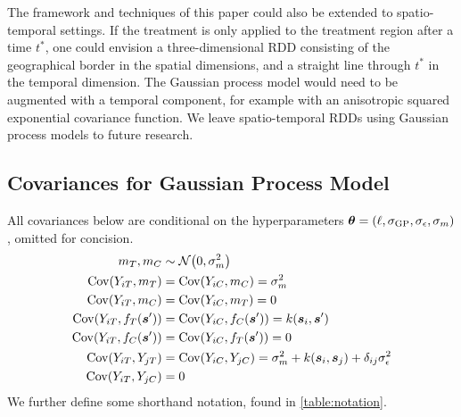 The framework and techniques of this paper could also be extended to spatio-temporal settings.
If the treatment is only applied to the treatment region after a time \(t^*\), one could envision a three-dimensional RDD consisting of the geographical border in the spatial dimensions, and a straight line through \(t^*\) in the temporal dimension.
The Gaussian process model would need to be augmented with a temporal component, for example with an anisotropic squared exponential covariance function.
We leave spatio-temporal RDDs using Gaussian process models to future research.





\begin{appendices}

\section{Covariances for Gaussian Process Model}
\label{sec:covariances}
All covariances below are conditional on the hyperparameters \(\bm{\theta} = \left\lparen\ell,\sigma_{\mathrm{GP}}, \sigma_{\epsilon}, \sigma_{m}\right\rparen\), omitted for concision.
\begin{equation}
    \begin{split}
        m_\treat, m_\ctrol   &\sim \normal\del{0,\sigmamu^2} \\
        \cov(Y_{i\treat},m_\treat)  &= \cov(Y_{i\ctrol},m_\ctrol) = \sigmamu^2 \\
        \cov(Y_{i\treat},m_\ctrol)  &= \cov(Y_{i\ctrol},m_\treat)  = 0 \\
        \cov\del{Y_{i\treat}, f_{\treat}(\svec')} &= \cov\del{Y_{i\ctrol}, f_{\ctrol}(\svec')} = k(\svec_i,\svec') \\
        \cov\del{Y_{i\treat}, f_{\ctrol}(\svec')} &= \cov\del{Y_{i\ctrol}, f_{\treat}(\svec')} = 0 \\
        \cov(Y_{i\treat},Y_{j\treat}) &= \cov(Y_{i\ctrol},Y_{j\ctrol}) = \sigmamu^2 + k(\svec_i,\svec_j) + \delta_{ij}\sigman^2 \\
        \cov(Y_{i\treat},Y_{j\ctrol}) &= 0
    \end{split}
    \label{eq:covariances}
\end{equation}
We further define some shorthand notation, found in \autoref{table:notation}.


\end{appendices}
